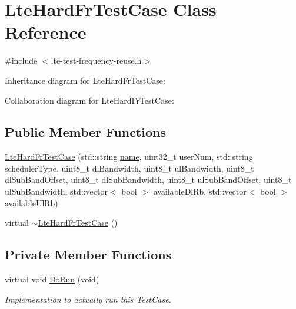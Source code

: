 \hypertarget{classLteHardFrTestCase}{}\section{Lte\+Hard\+Fr\+Test\+Case Class Reference}
\label{classLteHardFrTestCase}


{\ttfamily \#include $<$lte-\/test-\/frequency-\/reuse.\+h$>$}



Inheritance diagram for Lte\+Hard\+Fr\+Test\+Case\+:


Collaboration diagram for Lte\+Hard\+Fr\+Test\+Case\+:
\subsection*{Public Member Functions}
\begin{DoxyCompactItemize}
\item 
\hyperlink{classLteHardFrTestCase_aee9eeb250406944844ac9cc5a2bda788}{Lte\+Hard\+Fr\+Test\+Case} (std\+::string \hyperlink{generate__test__data__lte__spectrum__model_8m_ab74e6bf80237ddc4109968cedc58c151}{name}, uint32\+\_\+t user\+Num, std\+::string scheduler\+Type, uint8\+\_\+t dl\+Bandwidth, uint8\+\_\+t ul\+Bandwidth, uint8\+\_\+t dl\+Sub\+Band\+Offset, uint8\+\_\+t dl\+Sub\+Bandwidth, uint8\+\_\+t ul\+Sub\+Band\+Offset, uint8\+\_\+t ul\+Sub\+Bandwidth, std\+::vector$<$ bool $>$ available\+Dl\+Rb, std\+::vector$<$ bool $>$ available\+Ul\+Rb)
\item 
virtual \hyperlink{classLteHardFrTestCase_abccae984bb5daabbf39a72e6a559e0bb}{$\sim$\+Lte\+Hard\+Fr\+Test\+Case} ()
\end{DoxyCompactItemize}
\subsection*{Private Member Functions}
\begin{DoxyCompactItemize}
\item 
virtual void \hyperlink{classLteHardFrTestCase_a7267927f1ffb7acff88742eb33ab2e3c}{Do\+Run} (void)
\begin{DoxyCompactList}\small\item\em Implementation to actually run this Test\+Case. \end{DoxyCompactList}\end{DoxyCompactItemize}
